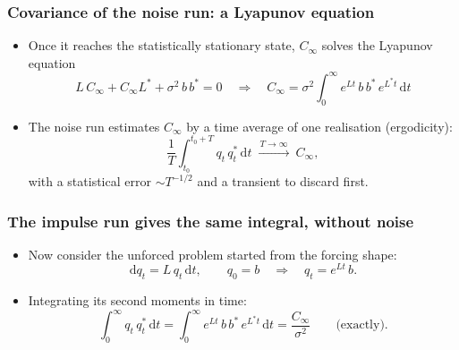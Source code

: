 \documentclass[
  aspectratio=169,
  t,
  onlytextwidth,
  10pt,
]{beamer}
\newcommand{\dd}{\mathrm{d}}
\newcommand{\E}{\mathbb{E}}
\begin{document}
\begin{frame}
	\frametitle{Covariance of the noise run: a Lyapunov equation}
	\begin{itemize}
		\item Once it reaches the statistically stationary state, $C_\infty$ solves the Lyapunov equation
		      \[
			      L\,C_\infty + C_\infty L^* + \sigma^2\,b\,b^* = 0
			      \quad\Longrightarrow\quad
			      \boxed{C_\infty = \sigma^2\int_0^\infty e^{Lt}\,b\,b^*\,e^{L^*t}\,\dd t}
		      \]
		\item The noise run estimates $C_\infty$ by a time average of one realisation (ergodicity):
		      \[
			      \frac{1}{T}\int_{t_0}^{t_0+T} q_t\,q_t^*\,\dd t \ \xrightarrow{\ T\to\infty\ }\ C_\infty ,
		      \]
		      with a statistical error $\sim T^{-1/2}$ and a transient to discard first.
	\end{itemize}
\end{frame}

\begin{frame}
	\frametitle{The impulse run gives the same integral, without noise}
	\begin{itemize}
		\item Now consider the unforced problem started from the forcing shape:
		      \[
			      \dd q_t = L\,q_t\,\dd t,\qquad q_0=b
			      \quad\Longrightarrow\quad q_t = e^{Lt}\,b .
		      \]
		\item Integrating its second moments in time:
		      \[
			      \int_0^\infty q_t\,q_t^*\,\dd t = \int_0^\infty e^{Lt}\,b\,b^*\,e^{L^*t}\,\dd t = \frac{C_\infty}{\sigma^2}
			      \qquad \text{(exactly).}
		      \]
	\end{itemize}
\end{frame}
\end{document}
